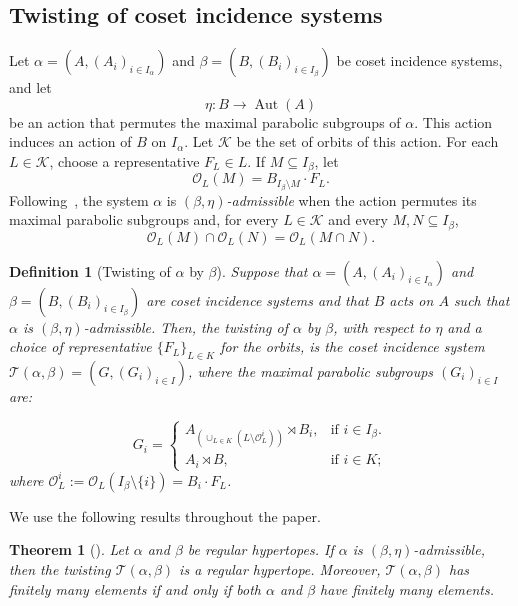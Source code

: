 \documentclass[11pt,letterpaper]{amsart}
\newtheorem{thm}[prop]{Theorem}
\newtheorem{definition}[prop]{Definition}
\DeclareMathOperator{\Aut}{Aut}
\newcommand{\TT}{\mathcal{T}}
\begin{document}
\subsection{Twisting of coset incidence systems}

Let $\alpha=(A,(A_i)_{i\in I_\alpha})$ and $\beta=(B,(B_i)_{i\in I_\beta})$ be coset incidence systems, and let
\[
\eta:B\longrightarrow\Aut(A)
\]
be an action that permutes the maximal parabolic subgroups of $\alpha$. This action induces an action of $B$ on $I_\alpha$. Let $\mathcal{K}$ be the set of orbits of this action. For each $L\in\mathcal{K}$, choose a representative $F_L\in L$. If $M\subseteq I_\beta$, let
$$
\mathcal{O}_L(M)=B_{I_\beta\setminus M}\cdot F_L.
$$
Following~\cite[Definition~3.8]{wreath}, the system $\alpha$ is \emph{$(\beta,\eta)$-admissible} when the action permutes its maximal parabolic subgroups and, for every $L\in\mathcal{K}$ and every $M,N\subseteq I_\beta$,
\begin{equation}\label{eq:IPO}
\mathcal{O}_L(M)\cap\mathcal{O}_L(N)=\mathcal{O}_L(M\cap N).
\end{equation}

\begin{definition}[Twisting of $\alpha$ by $\beta$]\cite{wreath}\label{def:gen_twist}
    Suppose that $\alpha=(A,(A_i)_{i\in I_\alpha})$ and $\beta=(B,(B_i)_{i\in I_\beta})$ are coset incidence systems and that $B$ acts on $A$ such that $\alpha$ is $(\beta,\eta)$-admissible. Then, the \textit{twisting} of $\alpha$ by $\beta$, with respect to $\eta$ and a choice of representative $\{F_L\}_{L \in K}$ for the orbits, is the coset incidence system $\TT(\alpha,\beta) = (G,(G_i)_{i \in I})$, where
    the maximal parabolic subgroups $(G_i)_{i \in I}$ are:

\begin{equation}
 G_i= \begin{cases}
     A_{(\cup_{L\in K}(L \setminus \mathcal{O}_L^i))} \rtimes B_i, & \text{if $i \in I_\beta$}.\\
     A_i \rtimes B, & \text{if $i \in K$};
  \end{cases}
\end{equation}
where $\mathcal{O}_L^i:=\mathcal{O}_L(I_\beta\setminus \{i\})=B_i\cdot F_L$.
\end{definition}


We use the following results throughout the paper.

\begin{thm}[{\cite[Corollary~3.17]{wreath}}]\label{thm:twisting-hypertope}
Let $\alpha$ and $\beta$ be regular hypertopes. If $\alpha$ is $(\beta,\eta)$-admissible, then the twisting $\TT(\alpha,\beta)$ is a regular hypertope. Moreover, $\TT(\alpha,\beta)$ has finitely many elements if and only if both $\alpha$ and $\beta$ have finitely many elements.
\end{thm}
\end{document}
